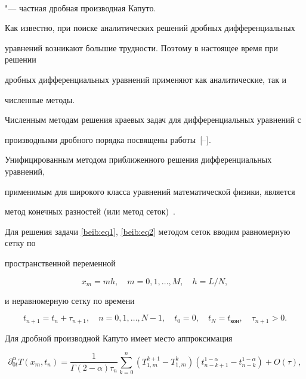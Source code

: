 $$

"--- частная дробная производная Капуто.



Как известно, при поиске аналитических решений дробных дифференциальных 

уравнений возникают большие трудности. Поэтому в настоящее время при решении 

дробных дифференциальных уравнений применяют как аналитические, так и 

численные методы.



Численным методам решения краевых задач для дифференциальных уравнений с 

производными дробного порядка посвящены работы~[--].



Унифицированным методом приближенного решения дифференциальных уравнений, 

применимым для широкого класса уравнений математической физики, является 

метод конечных разностей (или метод сеток)~\cite{beib:bib16}.



\smallskip




Для решения задачи \eqref{beib:eq1}, \eqref{beib:eq2} методом сеток вводим равномерную сетку по 

пространственной переменной

\[

x_m =mh,\quad m=0, 1, \ldots, M, \quad h={L}/{N},

\]

и неравномерную сетку по времени 

\[

t_{n+1} =t_n +\tau _{n+1},\quad n=0,1,\ldots,N-1,\quad t_0 =0,\quad t_N=t_{\text{кон}}, \quad \tau _{n+1} >0.

\]



Для дробной производной Капуто имеет место аппроксимация~\cite{beib:bib17}

\begin{equation}

\label{beib:eq3}

\partial _{0t}^\alpha T (x_m,t_n )=\frac{1}{\Gamma (2-\alpha )  \tau _n 

} \sum\limits_{k=0}^n ( T_{1,m}^{k+1} -T_{1,m}^k ) ( 

t_{n-k+1}^{1-\alpha } -t_{n-k}^{1-\alpha } )+O(\tau ),

\end{equation}


